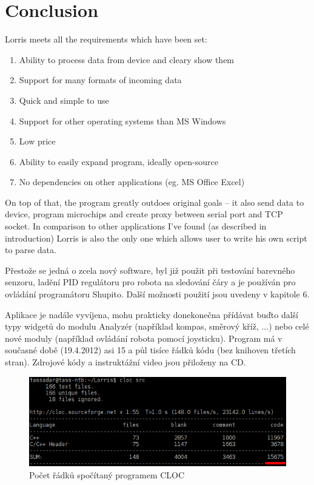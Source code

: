 \documentclass[12pt, a4paper, oneside]{article}
\newcommand{\Has}{\textcolor{green}{\CheckmarkBold}}
\begin{document}
\newpage
\section*{Conclusion}
Lorris meets all the requirements which have been set:
\begin{enumerate}[label=\Has\hspace{1.5mm}\arabic{*}.]
    \item Ability to process data from device and cleary show them %
    \item Support for many formats of incoming data%
    \item Quick and simple to use%
    \item Support for other operating systems than MS Windows %
    \item Low price%
    \item Ability to easily expand program, ideally open-source %
    \item No dependencies on other applications (eg. MS Office Excel) %
\end{enumerate}
On top of that, the program greatly outdoes original goals -- it also send data to device, program microchips and create proxy between serial port and TCP socket. In comparison to other applications I've found (as described in introduction) Lorris is also the only one which allows user to write his own script to parse data.

Přestože se jedná o zcela nový software, byl již použit při testování barevného senzoru, ladění PID regulátoru pro robota na sledování čáry a je používán pro ovládání programátoru Shupito. Další možnosti použití jsou uvedeny v kapitole 6.

Aplikace je nadále vyvíjena, mohu prakticky donekonečna přídávat buďto další typy widgetů do modulu Analyzér (například kompas, směrový kříž, ...) nebo celé nové moduly (například ovládání robota pomocí joysticku). Program má v současné době (19.4.2012) asi 15 a půl tisíce řádků kódu (bez knihoven třetích stran). Zdrojové kódy a instruktážní video jsou přiloženy na CD. 
\begin{figure}[H]
\begin{center}
\includegraphics[width=\textwidth]{img/cloc_edit.png}
\caption{Počet řádků spočítaný programem CLOC\cite{cloc}}
\end{center}
\end{figure}
\end{document}
